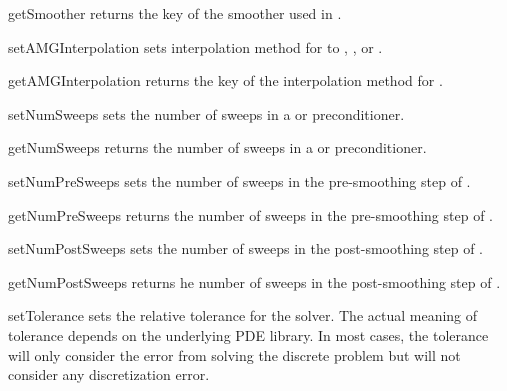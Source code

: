 \begin{methoddesc}[SolverOptions]{getSmoother}{}
returns the key of the smoother used in \AMG.
\end{methoddesc}

\begin{methoddesc}[SolverOptions]{setAMGInterpolation}{}
sets interpolation method for \AMG to
,
, or
.
\end{methoddesc}

\begin{methoddesc}[SolverOptions]{getAMGInterpolation}{}
returns the key of the interpolation method for \AMG.
\end{methoddesc}

\begin{methoddesc}[SolverOptions]{setNumSweeps}{}
sets the number of sweeps in a \JACOBI or \GAUSSSEIDEL preconditioner.
\end{methoddesc}

\begin{methoddesc}[SolverOptions]{getNumSweeps}{}
returns the number of sweeps in a \JACOBI or \GAUSSSEIDEL preconditioner.
\end{methoddesc}

\begin{methoddesc}[SolverOptions]{setNumPreSweeps}{}
sets the number of sweeps in the pre-smoothing step of \AMG.
\end{methoddesc}

\begin{methoddesc}[SolverOptions]{getNumPreSweeps}{}
returns the number of sweeps in the pre-smoothing step of \AMG.
\end{methoddesc}

\begin{methoddesc}[SolverOptions]{setNumPostSweeps}{}
sets the number of sweeps in the post-smoothing step of \AMG.
\end{methoddesc}

\begin{methoddesc}[SolverOptions]{getNumPostSweeps}{}
returns he number of sweeps in the post-smoothing step of \AMG.
\end{methoddesc}

\begin{methoddesc}[SolverOptions]{setTolerance}{}
sets the relative tolerance for the solver. The actual meaning of tolerance
depends on the underlying PDE library. In most cases, the tolerance
will only consider the error from solving the discrete problem but will
not consider any discretization error.
\end{methoddesc}

